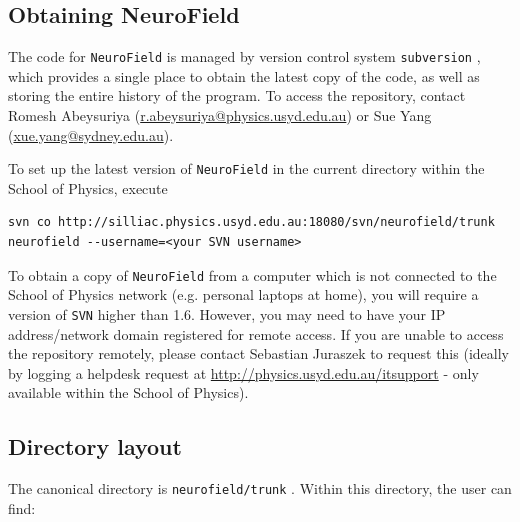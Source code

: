 \documentclass[12pt,a4paper]{article}
\newcommand{\type}[1]{ {\small\small\tt #1} }
\newcommand{\NF}[0]{ \type{NeuroField}}
\begin{document}
\subsection{Obtaining NeuroField}

The code for \NF is managed by version control system \type{subversion}, which provides a single place to obtain the latest copy of the code, as well as storing the entire history of the program. To access the repository, contact Romesh Abeysuriya (\url{r.abeysuriya@physics.usyd.edu.au}) or Sue Yang (\url{xue.yang@sydney.edu.au}).

To set up the latest version of \NF in the current directory within the School of Physics, execute
\begin{lstlisting}
svn co http://silliac.physics.usyd.edu.au:18080/svn/neurofield/trunk neurofield --username=<your SVN username>
\end{lstlisting}

To obtain a copy of \NF from a computer which is not connected to the School of Physics network (e.g. personal laptops at home), you will require a version of \type{SVN} higher than 1.6. However, you may need to have your IP address/network domain registered for remote access. If you are unable to access the repository remotely, please contact Sebastian Juraszek to request this (ideally by logging a helpdesk request at \url{http://physics.usyd.edu.au/itsupport} - only available within the School of Physics). 

\subsection{Directory layout}

The canonical directory is \type{neurofield/trunk}. Within this directory, the user can find:
\end{document}
